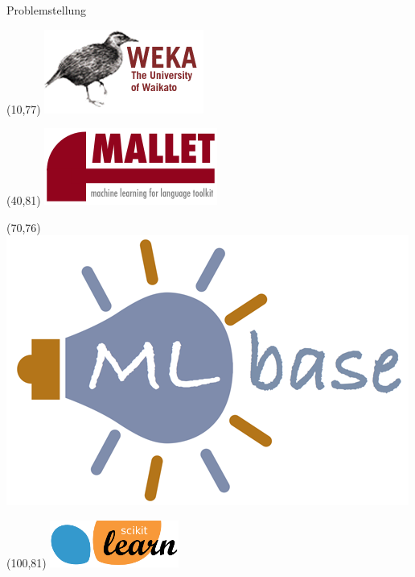 \documentclass{beamer}
\begin{document}
\begin{frame}[t]{Problemstellung}
\begin{textblock}{22}(10,77)
	\includegraphics[width=1\linewidth]{weka}
\end{textblock}
\begin{textblock}{22}(40,81)
	\includegraphics[width=1\linewidth]{mallet}
\end{textblock}
\begin{textblock}{22}(70,76)
	\includegraphics[width=1\linewidth]{mlbase}
\end{textblock}
\begin{textblock}{22}(100,81)
	\includegraphics[width=1\linewidth]{scikit}
\end{textblock}
\end{frame}
\end{document}
